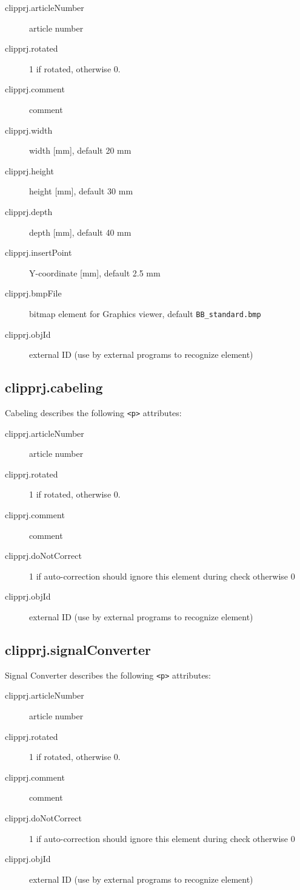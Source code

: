 \documentclass[%
	a4paper,
	oneside,
	listof=numbered,
	parskip=half,
	headsepline=true,
	footsepline=true,
	]{scrbook}
\begin{document}
\begin{description}
	\item[clipprj.articleNumber] article number 
	\item[clipprj.rotated] 1 if rotated, otherwise 0. 
	\item[clipprj.comment] comment 
	\item[clipprj.width] width [mm], default 20 mm 
	\item[clipprj.height] height [mm], default 30 mm 
	\item[clipprj.depth] depth [mm], default 40 mm 
	\item[clipprj.insertPoint] Y-coordinate [mm], default 2.5 mm 
	\item[clipprj.bmpFile] bitmap element for Graphics viewer, default \verb|BB_standard.bmp|
	\item[clipprj.objId] external ID (use by external programs to recognize element) 
\end{description}

\subsection{clipprj.cabeling}
 
Cabeling describes the following \verb|<p>| attributes: 

\begin{description}
	\item[clipprj.articleNumber] article number 
	\item[clipprj.rotated] 1 if rotated, otherwise 0. 
	\item[clipprj.comment] comment 
	\item[clipprj.doNotCorrect] 1 if auto-correction should ignore this element during check otherwise 0 
	\item[clipprj.objId] external ID (use by external programs to recognize element) 
\end{description}

\subsection{clipprj.signalConverter}
 
Signal Converter describes the following \verb|<p>| attributes: 

\begin{description}
	\item[clipprj.articleNumber] article number 
	\item[clipprj.rotated] 1 if rotated, otherwise 0. 
	\item[clipprj.comment] comment 
	\item[clipprj.doNotCorrect] 1 if auto-correction should ignore this element during check otherwise 0 
	\item[clipprj.objId] external ID (use by external programs to recognize element) 
\end{description}
\end{document}
